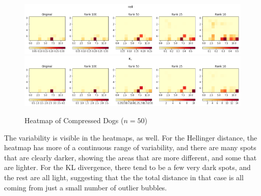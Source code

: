 \documentclass{article}
\begin{document}
\begin{figure}[h!]
\begin{center}
\includegraphics[width=\textwidth]{hell-dogs-50.png}
\includegraphics[width=\textwidth]{kl-dogs-50.png}
\caption{Heatmap of Compressed Dogs ($n=50$)}
\label{fig:dogheat50}
\end{center}
\end{figure}

The variability is visible in the heatmaps, as well. For the Hellinger
distance, the heatmap has more of a continuous range of variability, and there
are many spots that are clearly darker, showing the areas that are more
different, and some that are lighter. For the KL divergence, there tend to be a
few very dark spots, and the rest are all light, suggesting that the the total
distance in that case is all coming from just a small number of outlier
bubbles.

\clearpage
\printbibliography
\end{document}
